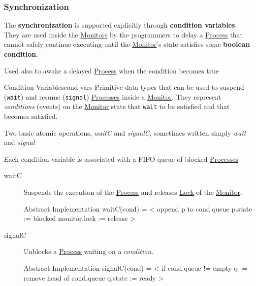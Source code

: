 \subsubsection{Synchronization}\label{sub:pi_mf_synchronization} %
The \textbf{synchronization} is supported explicitly through \textbf{condition variables}.
They are used inside the \hyperref[def:monitor]{Monitors} by the programmers to delay a \hyperref[def:process]{Process} that cannot safely continue executing until the \hyperref[def:monitor]{Monitor}'s state satisfies some \textbf{boolean condition}.
\begin{note}
    Used also to awake a delayed \hyperref[def:process]{Process} when the condition becomes true
\end{note}
\begin{definition}{Condition Variables}{cond-vars}
    Primitive data types that can be used to suspend (\texttt{wait}) and resume (\texttt{signal}) \hyperref[def:process]{Processes} inside a \hyperref[def:monitor]{Monitor}.
    They represent \textit{conditions} (events) on the \hyperref[def:monitor]{Monitor} state that \texttt{wait} to be satisfied and that becomes satisfied.
    \begin{note}
        Two basic atomic operations, \textit{waitC} and \textit{signalC}, sometimes written simply \textit{wait} and \textit{signal}
    \end{note}
    \begin{warning}
        Each condition variable is associated with a FIFO queue of blocked \hyperref[def:process]{Processes}
    \end{warning}
\end{definition}
\begin{description}
    \item[waitC] Suspends the execution of the \hyperref[def:process]{Process} and releases \hyperref[sub:cp_locks]{Lock} of the \hyperref[def:monitor]{Monitor}.
        \begin{codeblock}{Abstract Implementation}
    waitC(cond) =
        < append p to cond.queue
            p.state := blocked
            monitor.lock := release >
        \end{codeblock}
    \item[signalC] Unblocks a \hyperref[def:process]{Process} waiting on a \textit{condition}.
        \begin{codeblock}{Abstract Implementation}
    signalC(cond) =
        < if cond.queue != empty
            q := remove head of cond.queue
            q.state := ready >
        \end{codeblock}
\end{description}
